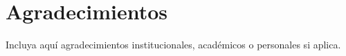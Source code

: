 \section{Agradecimientos}

Incluya aquí agradecimientos institucionales, académicos o personales si aplica.
